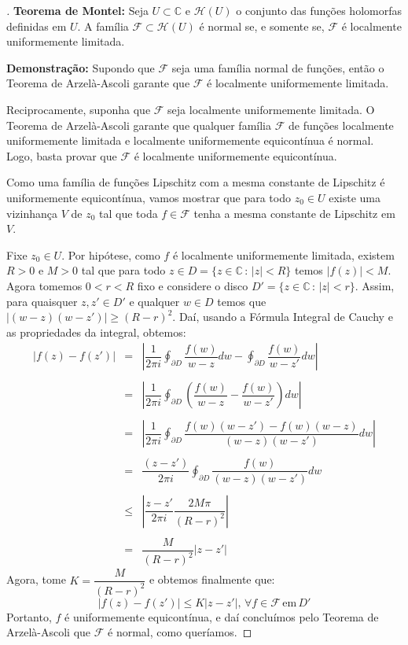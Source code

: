 \begin{proof}[]
\textbf{Teorema de Montel: }Seja $U\subset\mathbb{C}$ e $\mathcal{H}(U)$ o conjunto das funções holomorfas definidas em $U$. A família $\mathcal{F}\subset\mathcal{H}(U)$ é normal se, e somente se, $\mathcal{F}$ é localmente uniformemente limitada.

\textbf{Demonstração: } Supondo que $\mathcal{F}$ seja uma família normal de funções, então o Teorema de Arzelà-Ascoli garante que $\mathcal{F}$ é localmente uniformemente limitada.

Reciprocamente, suponha que $\mathcal{F}$ seja localmente uniformemente limitada. O Teorema de Arzelà-Ascoli garante que qualquer família $\mathcal{F}$ de funções localmente uniformemente limitada e localmente uniformemente equicontínua é normal. Logo, basta provar que $\mathcal{F}$ é localmente uniformemente equicontínua.

Como uma família de funções Lipschitz com a mesma constante de Lipschitz é uniformemente equicontínua, vamos mostrar que para todo $z_0\in U$ existe uma vizinhança $V$ de $z_0$ tal que toda $f\in\mathcal{F}$ tenha a mesma constante de Lipschitz em $V$. 

Fixe $z_0\in U$. Por hipótese, como $f$ é localmente uniformemente limitada, existem $R>0$ e $M>0$ tal que para todo $z \in D = \{z\in\mathbb{C}\,:\, |z|<R\}$ temos $|f(z)|< M$. Agora tomemos $0<r<R$ fixo e considere o disco $D'=\{z\in\mathbb{C}\,:\, |z|<r\}$. Assim, para quaisquer $z,z'\in D'$ e qualquer $w\in D$ temos que $|(w-z)(w-z')|\geq(R-r)^2$. Daí, usando a Fórmula Integral de Cauchy e as propriedades da integral, obtemos: $$\begin{array}{ccc}|f(z)-f(z')| & = & \left|\dfrac{1}{2\pi i}\displaystyle\oint_{\partial D}\dfrac{f(w)}{w-z}dw - \displaystyle\oint_{\partial D}\dfrac{f(w)}{w-z'}dw\right| \\ \\ & = & \left|\dfrac{1}{2\pi i}\displaystyle\oint_{\partial D}\left(\dfrac{f(w)}{w-z} - \dfrac{f(w)}{w-z'}\right)dw\right| \\ \\ & = &\left|\dfrac{1}{2\pi i}\displaystyle\oint_{\partial D}\dfrac{f(w)(w-z')-f(w)(w-z)}{(w-z)(w-z')}dw\right| \\ \\ & = & \dfrac{(z-z')}{2\pi i}\displaystyle\oint_{\partial D}\dfrac{f(w)}{(w-z)(w-z')}dw \\ \\ & \leq & \left|\dfrac{z-z'}{2\pi i}\dfrac{2M\pi}{(R-r)^2} \right| \\ \\ & = & \dfrac{M}{(R-r)^2}|z-z'| \end{array}$$
Agora, tome $K = \dfrac{M}{(R-r)^2}$ e obtemos finalmente que: $$|f(z)-f(z')|\leq K|z-z'|,\,\forall f\in\mathcal{F}\,\textrm{em}\,D'$$Portanto, $f$ é uniformemente equicontínua, e daí concluímos pelo Teorema de Arzelà-Ascoli que $\mathcal{F}$ é normal, como queríamos.
\end{proof}

